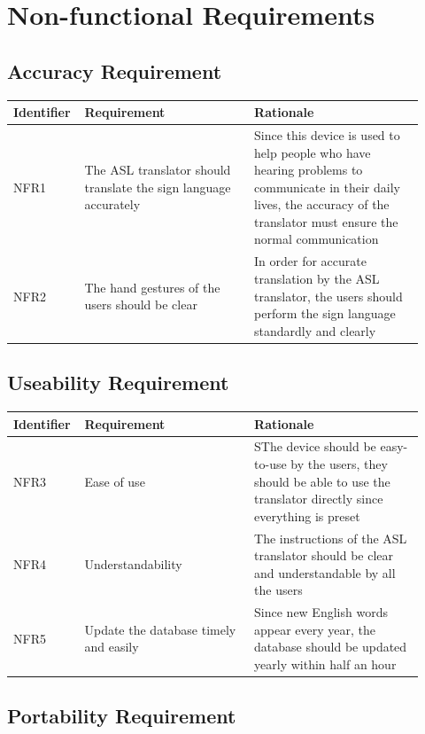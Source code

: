 \documentclass[12pt]{article}
\begin{document}
\section{Non-functional Requirements}
\subsection{Accuracy Requirement}

\renewcommand{\arraystretch}{1.2}
\noindent \begin{tabularx}{\textwidth}{p{0.12\linewidth}|p{0.4\linewidth}|p{0.4\linewidth}}
\toprule
\textbf{Identifier} & \textbf{Requirement} & \textbf{Rationale}\\
\midrule
NFR1
& The ASL translator should translate the sign language accurately 
& Since this device is used to help people who have hearing problems to communicate in their daily lives, the accuracy of the translator must ensure the normal communication\\
\hline
NFR2
&The hand gestures of the users should be clear
&In order for accurate translation by the ASL translator, the users should perform the sign language standardly and clearly\\
\bottomrule
\end{tabularx}

\subsection{Useability Requirement}

\renewcommand{\arraystretch}{1.2}
\noindent \begin{tabularx}{\textwidth}{p{0.12\linewidth}|p{0.4\linewidth}|p{0.4\linewidth}}
\toprule
\textbf{Identifier} & \textbf{Requirement} & \textbf{Rationale}\\
\midrule
NFR3
& Ease of use 
& SThe device should be easy-to-use by the users, they should be able to use the translator directly since everything is preset\\
\hline
NFR4
& Understandability
& The instructions of the ASL translator should be clear and understandable by all the users\\
\hline
NFR5
& Update the database timely and easily
& Since new English words appear every year, the database should be updated yearly within half an hour\\
\bottomrule
\end{tabularx}

\subsection{Portability Requirement}
\end{document}
